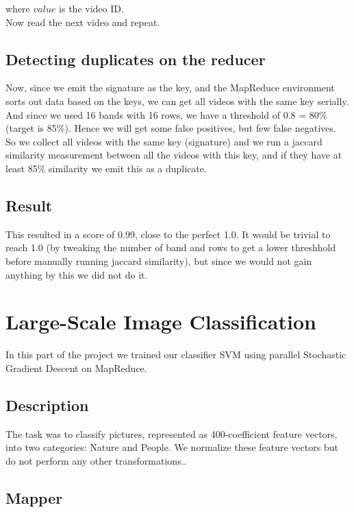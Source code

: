 \documentclass[a4paper, 11pt]{article}
\begin{document}
                where $value$ is the video ID.\\
                Now read the next video and repeat.
                
        \subsection{Detecting duplicates on the reducer}
                Now, since we emit the signature as the key, and the MapReduce environment sorts out data based on the keys, we can get all videos with the same key serially. And since we used 16 bands with 16 rows, we have a threshold of 0.8 = 80\% (target is 85\%). Hence we will get some false positives, but few false negatives.\\

                So we collect all videos with the same key (signature) and we run a jaccard similarity measurement between all the videos with this key, and if they have at least 85\% similarity we emit this as a duplicate.

        \subsection{Result}
                This resulted in a score of 0.99, close to the perfect 1.0. It would be trivial to reach 1.0  (by tweaking the number of band and rows to get a lower threshhold before manually running jaccard similarity), but since we would not gain anything by this we did not do it. 

\section{Large-Scale Image Classification}

In this part of the project we trained our classifier SVM using parallel Stochastic Gradient Descent on MapReduce. 

\subsection{Description}

The task was to classify pictures, represented as 400-coefficient feature vectors, into two categories: Nature and People. We normalize these feature vectors but do not perform any other transformations..

\subsection{Mapper}
\end{document}
